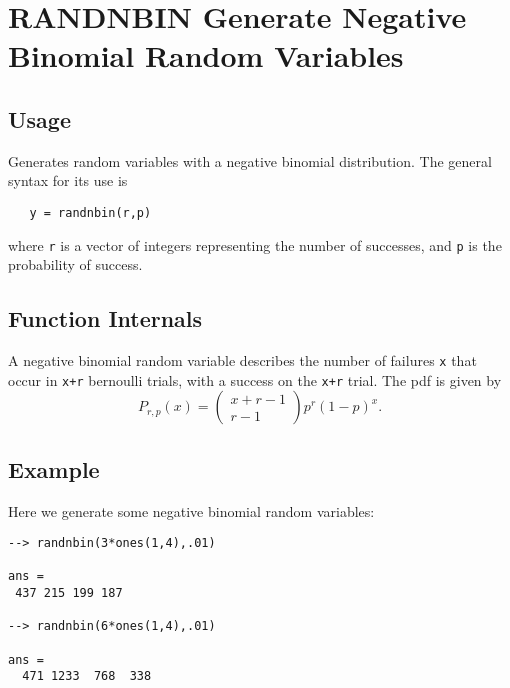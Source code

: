 \section{RANDNBIN Generate Negative Binomial Random Variables}

\subsection{Usage}

Generates random variables with a negative binomial distribution.
The general syntax for its use is
\begin{verbatim}
   y = randnbin(r,p)
\end{verbatim}
where \verb|r| is a vector of integers representing the number of
successes, and \verb|p| is the probability of success.
\subsection{Function Internals}

A negative binomial random variable describes the number of failures
\verb|x| that occur in \verb|x+r| bernoulli trials, with a success on the 
\verb|x+r| trial.  The pdf is given by
\[
  P_{r,p}(x)=\left(\begin{matrix} x+r-1 \\ r-1 \end{matrix}\right)p^r(1-p)^x.
\]
\subsection{Example}

Here we generate some negative binomial random variables:
\begin{verbatim}
--> randnbin(3*ones(1,4),.01)

ans = 
 437 215 199 187 

--> randnbin(6*ones(1,4),.01)

ans = 
  471 1233  768  338 
\end{verbatim}
